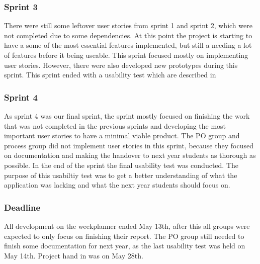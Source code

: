 \subsubsection{Sprint 3}
There were still some leftover user stories from sprint 1 and sprint 2, which were not completed due to some dependencies. 
At this point the project is starting to have a some of the most essential features implemented, but still a needing a lot of features before it being useable. 
This sprint focused mostly on implementing user stories.
However, there were also developed new prototypes during this sprint.
This sprint ended with a usability test which are described in 

\subsubsection{Sprint 4}
As sprint 4 was our final sprint, the sprint mostly focused on finishing the work that was not completed in the previous sprints and developing the most important user stories to have a minimal viable product.
The PO group and process group did not implement user stories in this sprint, because they focused on documentation and making the handover to next year students as thorough as possible.
In the end of the sprint the final usability test was conducted.
The purpose of this usabiltiy test was to get a better understanding of what the application was lacking and what the next year students should focus on.

\subsubsection{Deadline}
All development on the weekplanner ended May 13th, after this all groups were expected to only focus on finishing their report.
The PO group still needed to finish some documentation for next year, as the last usability test was held on May 14th.
Project hand in was on May 28th.
